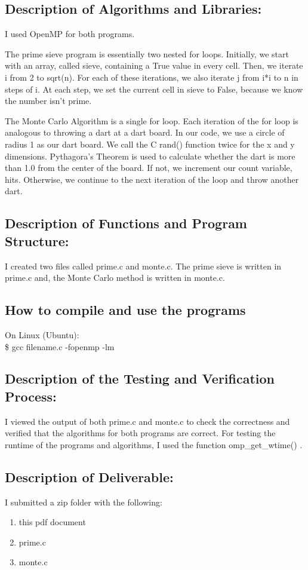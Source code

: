 \documentclass[12pt]{article}
\begin{document}
\subsection*{Description of Algorithms and Libraries: } 
I used OpenMP for both programs.  

The prime sieve program is essentially two nested for loops. Initially, we start with an 
array, called sieve, containing a True value in every cell. Then, we iterate i from 2 to
sqrt(n). For each of these iterations, we also iterate j from i*i to n in steps of i. At
each step, we set the current cell in sieve to False, because we know the number isn't prime.

The Monte Carlo Algorithm is a single for loop. Each iteration of the for loop is analogous 
to throwing a dart at a dart board. In our code, we use a circle of radius 1 as our dart board.
We call the C rand() function twice for the x and y dimensions. Pythagora's Theorem is used
to calculate whether the dart is more than 1.0 from the center of the board. If not, we
increment our count variable, hits. Otherwise, we continue to the next iteration of the loop
and throw another dart.

\subsection*{Description of Functions and Program Structure: } 
I created two files called prime.c and monte.c. 
The prime sieve is written in prime.c and, the Monte Carlo method is written in monte.c.  

\subsection*{How to compile and use the programs}
On Linux (Ubuntu): \\
\$ gcc filename.c -fopenmp -lm 

\subsection*{Description of the Testing and Verification Process: }
I viewed the output of both prime.c and monte.c to check the 
correctness and verified that the algorithms for both programs are correct.  
For testing the runtime of the programs and algorithms, I used the function omp\_get\_wtime() .

\subsection*{Description of Deliverable: }
I submitted a zip folder with the following: 
\begin{enumerate}
  \item this pdf document
  \item prime.c
  \item monte.c
\end{enumerate}
\end{document}
